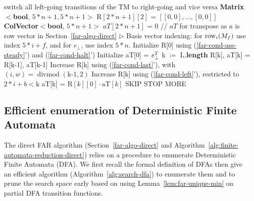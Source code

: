 \begin{algorithm}
  \caption{{\sc decider-finite-automata-reduction-direct}}\label{alg:finite-automata-reduction-direct}

  \begin{algorithmic}[1]
     switch all left-going transitions of the TM to right-going and vice versa
    \EndIf
    \State \textbf{Matrix$\boldsymbol<$bool}, $5*n+1, 5*n+1${}$\boldsymbol>$ $\textrm{R}[2*n+1][2]$ = $[[0,0],\ldots,[0,0]]$
    \State \textbf{ColVector$\boldsymbol<$bool}, $5*n+1${}$\boldsymbol>$ $aT[2*n+1]$ = 0 // $aT$ for transpose as $a$ is row vector in Section~\ref{far-algo-direct}
    \State \(\triangleright\) Basis vector indexing: for $\text{row}_i(M_f)$ use index $5*i+f$, and for $e_\bot$, use index $5*n$.
    \State Initialize R[0] using (\ref{far-cond-ass-steady}') and (\ref{far-cond-halt}')
    \State Initialize aT[0] = $e_\bot^T$
    \State k $\coloneqq$ L.\textbf{length}
    \State R[k], aT[k] = R[k-1], aT[k-1]
    \State Increase R[k] using (\ref{far-cond-last}'), with $(i,w)=\operatorname{divmod}(\textrm{k-1}, 2)$
    \Repeat
    \State Increase R[k] using (\ref{far-cond-left}'), restricted to $2*i+b<\textrm{k}$
    \Repeat
    \State aT[k] = $\textrm{R}[k][0] \cdot \textrm{aT}[k]$
    \Return SKIP
    \Return STOP
    \Else\;\Return MORE
    \EndIf
    \EndProcedure
    \State \Return {}
    \EndProcedure
  \end{algorithmic}
\end{algorithm}

\subsection{Efficient enumeration of Deterministic Finite Automata}
\label{far-defs-dfa}
The direct FAR algorithm (Section~\ref{far-algo-direct} and Algorithm~\ref{alg:finite-automata-reduction-direct}) relies on a procedure to enumerate Deterministic Finite Automata (DFA). We first recall the formal definition of DFAs then give an efficient algorithm (Algorithm~\ref{alg:search-dfa}) to enumerate them and to prune the search space early based on using Lemma~\ref{lem:far-unique-min} on partial DFA transition functions.

